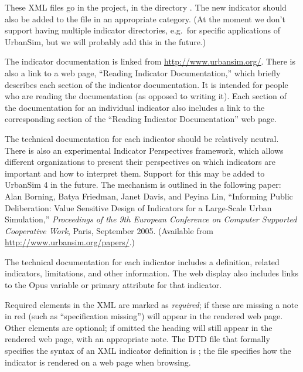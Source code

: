 These XML files go in the  project, in the directory
.  The new indicator should also be added
to the  file in an appropriate category.
(At the moment we don't support having multiple indicator directories,
e.g.\ for specific applications of UrbanSim, but we will probably add this
in the future.)

The indicator documentation is
linked from \url{http://www.urbansim.org/}.  There is also a link
to a web page, ``Reading Indicator Documentation,'' which briefly describes
each section of the indicator documentation.  It is intended for people who
are reading the documentation (as opposed to writing it).
Each section of the documentation for an individual indicator
also includes a link to the corresponding section of the ``Reading
Indicator Documentation'' web page.

The technical documentation for each indicator should be relatively neutral.  There is also
an experimental Indicator Perspectives framework, which allows different organizations
to present their perspectives on which indicators are important and how to interpret
them.  Support for this may be added to UrbanSim 4 in the future.  The mechanism is
outlined in the following paper:
Alan Borning, Batya Friedman, Janet Davis, and Peyina Lin,
``Informing Public Deliberation: Value Sensitive Design of Indicators for a
Large-Scale Urban Simulation,'' \emph{Proceedings of the 9th European
Conference on Computer Supported Cooperative Work}, Paris, September 2005.  (Available
from \url{http://www.urbansim.org/papers/}.)

The technical documentation for each indicator includes a definition,
related indicators, limitations, and other information.  The web display
also includes links to the Opus variable or primary attribute for that
indicator.

Required elements in the XML are marked as \emph{required}; if these
are missing a note in red (such as ``specification missing'') will
appear in the rendered web page. Other elements are optional; if
omitted the heading will still appear in the rendered web page, with
an appropriate note. The DTD file that formally specifies the syntax
of an XML indicator definition is ;
the file  specifies how the indicator is
rendered on a web page when browsing.


